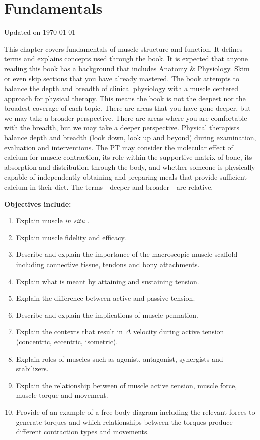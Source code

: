 \chapter{Fundamentals}\label{chp:fundamentals}
Updated on \today
\minitoc

This chapter covers fundamentals of muscle structure and function. It defines terms and explains concepts used through the book. It is expected that anyone reading this book has a background that includes Anatomy \& Physiology. Skim or even skip sections that you have already mastered. The book attempts to balance the depth and breadth of clinical physiology with a muscle centered approach for physical therapy. This means the book is not the deepest nor the broadest coverage of each topic. There are areas that you have gone deeper, but we may take a broader perspective. There are areas where you are comfortable with the breadth, but we may take a deeper perspective. Physical therapists balance depth and breadth (look down, look up and beyond) during examination, evaluation and interventions. The PT may consider the molecular effect of calcium for muscle contraction, its role within the supportive matrix of bone, its absorption and distribution through the body, and whether someone is physically capable of independently obtaining and preparing meals that provide sufficient calcium in their diet. The terms - deeper and broader - are relative.

\vspace{5mm}

\textbf{Objectives include:}
\begin{enumerate}
   \item Explain muscle \textit{in situ} .
   \item Explain muscle fidelity and efficacy. 
    \item Describe and explain the importance of the macroscopic muscle scaffold including connective tissue, tendons and bony attachments.
    \item Explain what is meant by attaining and sustaining tension.
    \item Explain the difference between active and passive tension.
    \item Describe and explain the implications of muscle pennation.
    \item Explain the contexts that result in $\Delta$ velocity during active tension (concentric, eccentric, isometric).
    \item Explain roles of muscles such as agonist, antagonist, synergists and stabilizers.
    \item Explain the relationship between of muscle active tension, muscle force, muscle torque and movement.
    \item Provide of an example of a free body diagram including the relevant forces to generate torques and which relationships between the torques produce different contraction types and movements.
\end{enumerate}

